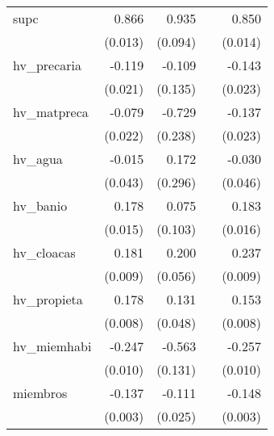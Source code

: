 {\begin{longtable}{l*{4}{D{.}{.}{-1}}}
\addlinespace
supc        &       0.866\sym{***}&       0.935\sym{***}&                     &       0.850\sym{***}\\
            &     (0.013)         &     (0.094)         &                     &     (0.014)         \\
\addlinespace
hv\_precaria &      -0.119\sym{***}&      -0.109         &                     &      -0.143\sym{***}\\
            &     (0.021)         &     (0.135)         &                     &     (0.023)         \\
\addlinespace
hv\_matpreca &      -0.079\sym{***}&      -0.729\sym{**} &                     &      -0.137\sym{***}\\
            &     (0.022)         &     (0.238)         &                     &     (0.023)         \\
\addlinespace
hv\_agua     &      -0.015         &       0.172         &                     &      -0.030         \\
            &     (0.043)         &     (0.296)         &                     &     (0.046)         \\
\addlinespace
hv\_banio    &       0.178\sym{***}&       0.075         &                     &       0.183\sym{***}\\
            &     (0.015)         &     (0.103)         &                     &     (0.016)         \\
\addlinespace
hv\_cloacas  &       0.181\sym{***}&       0.200\sym{***}&                     &       0.237\sym{***}\\
            &     (0.009)         &     (0.056)         &                     &     (0.009)         \\
\addlinespace
hv\_propieta &       0.178\sym{***}&       0.131\sym{**} &                     &       0.153\sym{***}\\
            &     (0.008)         &     (0.048)         &                     &     (0.008)         \\
\addlinespace
hv\_miemhabi &      -0.247\sym{***}&      -0.563\sym{***}&                     &      -0.257\sym{***}\\
            &     (0.010)         &     (0.131)         &                     &     (0.010)         \\
\addlinespace
miembros    &      -0.137\sym{***}&      -0.111\sym{***}&                     &      -0.148\sym{***}\\
            &     (0.003)         &     (0.025)         &                     &     (0.003)         \\

\end{longtable}}
